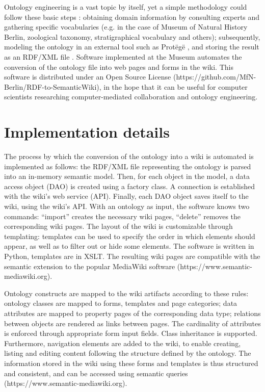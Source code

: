 \documentclass[manuscript,screen,review]{acmart}
\begin{document}
Ontology engineering is a vast topic by itself, yet a simple methodology could follow these basic steps \cite{noy2001}: obtaining domain information by consulting experts and gathering specific vocabularies (e.g. in the case of Museum of Natural History Berlin, zoological taxonomy, stratigraphical vocabulary and others); subsequently, modeling the ontology in an external tool such as Prot\"eg\"e \cite{musen2015}, and storing the result as an RDF/XML file \cite{gandon2014}. Software implemented at the Museum automates the conversion of the ontology file into web pages and forms in the wiki. This software is distributed under an Open Source License (https://github.com/MfN-Berlin/RDF-to-SemanticWiki), in the hope that it can be useful for computer scientists researching computer-mediated collaboration and ontology engineering.

\section{Implementation details}
The process by which the conversion of the ontology into a wiki is automated is implemented as follows: the RDF/XML file representing the ontology is parsed into an in-memory semantic model. Then, for each object in the model, a data access object (DAO) is created using a factory class. A connection is established with the wiki's web service (API). Finally, each DAO object saves itself to the wiki, using the wiki's API. With an ontology as input, the software knows two commands: ``import'' creates the necessary wiki pages, ``delete'' removes the corresponding wiki pages. The layout of the wiki is customizable through templating: templates can be used to specify the order in which elements should appear, as well as to filter out or hide some elements. The software is written in Python, templates are in XSLT. The resulting wiki pages are compatible with the semantic extension to the popular MediaWiki software (https://www.semantic-mediawiki.org).

Ontology constructs are mapped to the wiki artifacts according to these rules: ontology classes are mapped to forms, templates and page categories; data attributes are mapped to property pages of the corresponding data type; relations between objects are rendered as links between pages. The cardinality of attributes is enforced through appropriate form input fields. Class inheritance is supported. Furthermore, navigation elements are added to the wiki, to enable creating, listing and editing content following the structure defined by the ontology. The information stored in the wiki using these forms and templates is thus structured and consistent, and can be accessed using semantic queries (https://www.semantic-mediawiki.org).
\end{document}
